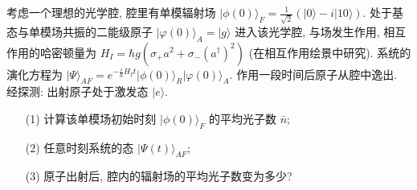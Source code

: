 \documentclass{assignment}
\begin{document}
\begin{prob}
    考虑一个理想的光学腔, 腔里有单模辐射场 $\lvert\phi(0)\rangle_F=\frac{1}{\sqrt{2}}(\lvert 0\rangle-i\lvert 10\rangle)$. 处于基态与单模场共振的二能级原子 $\lvert\varphi(0)\rangle_A=\lvert g\rangle$ 进入该光学腔, 与场发生作用, 相互作用的哈密顿量为 $H_I=\hbar g(\sigma_+a^2+\sigma_-(a^{\dagger})^2)$ (在相互作用绘景中研究). 系统的演化方程为 $\lvert\Psi\rangle_{AF}=e^{-\frac{i}{\hbar}H_It}\lvert\phi(0)\rangle_R\lvert\varphi(0)\rangle_A$. 作用一段时间后原子从腔中逸出. 经探测: 出射原子处于激发态 $\lvert e\rangle$.
    \begin{itemize}
        \item[(1)] 计算该单模场初始时刻 $\lvert\phi(0)\rangle_F$ 的平均光子数 $\bar{n}$;
        \item[(2)] 任意时刻系统的态 $\lvert\Psi(t)\rangle_{AF}$;
        \item[(3)] 原子出射后, 腔内的辐射场的平均光子数变为多少?
    \end{itemize}
\end{prob}
\end{document}
